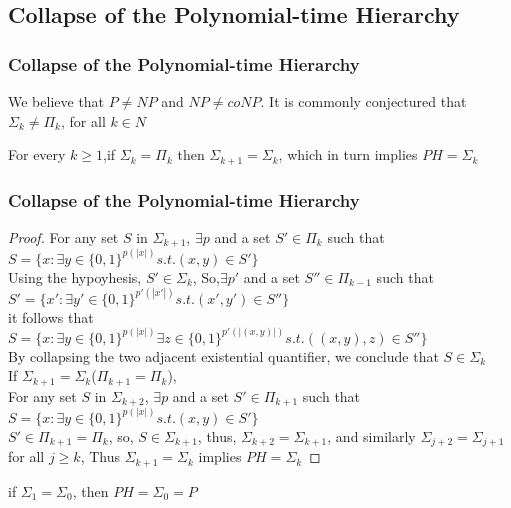 \documentclass{beamer}
\begin{document}
\subsection{Collapse of the Polynomial-time Hierarchy}
\begin{frame}
\frametitle{Collapse of the Polynomial-time Hierarchy}
We believe that $P \neq NP$ and $NP \neq coNP$. It is commonly conjectured that$\Sigma_{k} \neq \Pi_{k}$, for all $k \in N$
\begin{theorem}
For every $k \geq 1$,if $\Sigma_{k} = \Pi_{k}$ then $\Sigma_{k+1} = \Sigma_{k}$, which in turn implies $PH = \Sigma_{k}$
\end{theorem}
\end{frame}

\begin{frame}
\frametitle{Collapse of the Polynomial-time Hierarchy}
\begin{proof}
For any set $S$ in $\Sigma_{k+1}$, $\exists p$ and a set $S' \in \Pi_{k}$ such that $S =\{x : \exists y \in \{0, 1\}^{p(|x|)} s.t. (x, y) \in S'\}$\\
Using the hypoyhesis, $S' \in \Sigma_{k}$, So,$\exists p'$ and a set $S'' \in \Pi_{k-1}$ such that $S' =\{x' : \exists y' \in \{0, 1\}^{p'(|x'|)} s.t. (x', y') \in S''\}$\\
it follows that $S =\{x : \exists y \in \{0, 1\}^{p(|x|)} \exists z \in \{0, 1\}^{p'(|(x,y)|)} s.t. ((x, y),z) \in S''\}$\\
By collapsing the two adjacent existential quantifier, we conclude that $S \in \Sigma_{k}$\\

If $\Sigma_{k+1} = \Sigma_{k}$($\Pi_{k+1} = \Pi_{k}$),\\
For any set $S$ in $\Sigma_{k+2}$, $\exists p$ and a set $S' \in \Pi_{k+1}$ such that $S =\{x : \exists y \in \{0, 1\}^{p(|x|)} s.t. (x, y) \in S'\}$\\
$S' \in \Pi_{k+1} = \Pi_{k}$, so, $S \in \Sigma_{k+1}$, thus, $\Sigma_{k+2} = \Sigma_{k+1}$, and similarly $\Sigma_{j+2} = \Sigma_{j+1}$ for all $j \geq k$, Thus $\Sigma_{k+1} = \Sigma_{k}$ implies $PH = \Sigma_{k}$
\end{proof}
if $\Sigma_{1} = \Sigma_{0}$, then $PH = \Sigma_{0} = P$
\end{frame}
\end{document}
